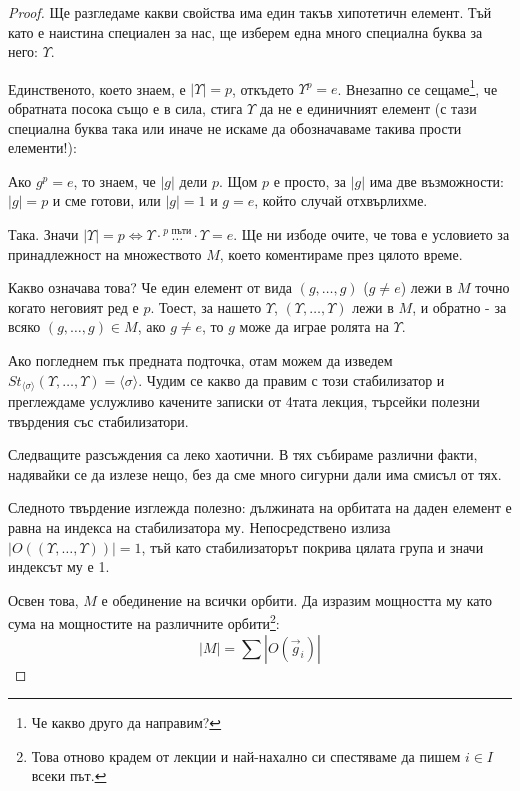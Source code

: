 \documentclass{article}
\theoremstyle{definition}
\newcommand{\grsigma}[0]{{\langle \sigma \rangle}}
\begin{document}
\begin{proof}

    Ще разгледаме какви свойства има един такъв хипотетичн елемент.
    Тъй като е наистина специален за нас, ще изберем една много специална буква за него: $\Upsilon$.

    Единственото, което знаем, е $|\Upsilon| = p$, откъдето $\Upsilon^p = e$.
    Внезапно се сещаме\footnote{Че какво друго да направим?}, че обратната посока също е в сила, стига $\Upsilon$ да не е единичният елемент
    (с тази специална буква така или иначе не искаме да обозначаваме такива прости елементи!):

    Ако ${g^p = e}$, то знаем, че $|g|$ дели $p$.
    Щом $p$ е просто, за $|g|$ има две възможности: $|g| = p$ и сме готови, или $|g| = 1$ и $g = e$, който случай отхвърлихме.

    Така. Значи $|\Upsilon| = p \Longleftrightarrow \Upsilon \cdot \overset{p \textit{ пъти}}{\dots} \cdot \Upsilon = e$.
    Ще ни избоде очите, че това е условието за принадлежност на множеството $M$, което коментираме през цялото време.

    Какво означава това? Че един елемент от вида $(g, \dots, g)$ ($g \not= e$) лежи в $M$ точно когато неговият ред е $p$.
    Тоест, за нашето $\Upsilon$, $(\Upsilon, \dots, \Upsilon)$ лежи в $M$, и обратно - за всяко $(g, \dots, g) \in M$, ако $g \not= e$, то $g$ може да играе ролята на $\Upsilon$.

    Ако погледнем пък предната подточка, отам можем да изведем $St_{\grsigma}(\Upsilon, \dots, \Upsilon) = \grsigma$. Чудим се какво да правим с този стабилизатор и преглеждаме услужливо качените записки от 4тата лекция, търсейки полезни твърдения със стабилизатори.

    Следващите разсъждения са леко хаотични. В тях събираме различни факти, надявайки се да излезе нещо, без да сме много сигурни дали има смисъл от тях.

    Следното твърдение изглежда полезно: дължината на орбитата на даден елемент е равна на индекса на стабилизатора му.
    Непосредствено излиза $|O((\Upsilon,\dots,\Upsilon))| = 1$, тъй като стабилизаторът покрива цялата група и значи индексът му е 1.

    Освен това, $M$ е обединение на всички орбити.
    Да изразим мощността му като сума на мощностите на различните орбити\footnote{Това отново крадем от лекции и най-нахално си спестяваме да пишем $i\in I$ всеки път.}:
    $$|M| = \sum |O(\vec g_i)|$$

    \newcommand{\gunint}{{\vec g_i \not\in M_\Upsilon}}


\end{proof}
\end{document}
